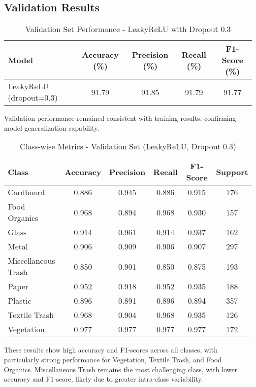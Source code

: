 \documentclass[12pt,a4paper]{article}
\begin{document}
\subsection{Validation Results}

\begin{table}[H]
\centering
\caption{Validation Set Performance - LeakyReLU with Dropout 0.3}
\begin{tabular}{lcccc}
\toprule
\textbf{Model} & \textbf{Accuracy (\%)} & \textbf{Precision (\%)} & \textbf{Recall (\%)} & \textbf{F1-Score (\%)} \\
\midrule
LeakyReLU (dropout=0.3) & 91.79 & 91.85 & 91.79 & 91.77 \\
\bottomrule
\end{tabular}
\end{table}

Validation performance remained consistent with training results, confirming model generalization capability.

\begin{table}[H]
\centering
\caption{Class-wise Metrics - Validation Set (LeakyReLU, Dropout 0.3)}
\begin{tabular}{lccccc}
\toprule
\textbf{Class} & \textbf{Accuracy} & \textbf{Precision} & \textbf{Recall} & \textbf{F1-Score} & \textbf{Support} \\
\midrule
Cardboard & 0.886 & 0.945 & 0.886 & 0.915 & 176 \\
Food Organics & 0.968 & 0.894 & 0.968 & 0.930 & 157 \\
Glass & 0.914 & 0.961 & 0.914 & 0.937 & 162 \\
Metal & 0.906 & 0.909 & 0.906 & 0.907 & 297 \\
Miscellaneous Trash & 0.850 & 0.901 & 0.850 & 0.875 & 193 \\
Paper & 0.952 & 0.918 & 0.952 & 0.935 & 188 \\
Plastic & 0.896 & 0.891 & 0.896 & 0.894 & 357 \\
Textile Trash & 0.968 & 0.904 & 0.968 & 0.935 & 126 \\
Vegetation & 0.977 & 0.977 & 0.977 & 0.977 & 172 \\
\bottomrule
\end{tabular}
\end{table}

These results show high accuracy and F1-scores across all classes, with particularly strong performance for Vegetation, Textile Trash, and Food Organics. Miscellaneous Trash remains the most challenging class, with lower accuracy and F1-score, likely due to greater intra-class variability.
\end{document}
